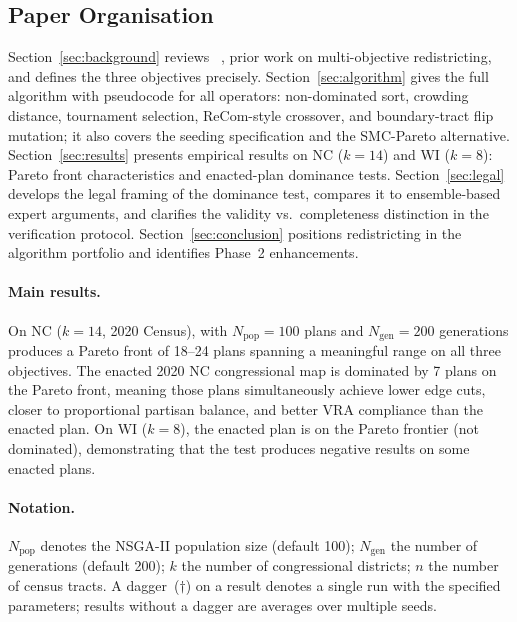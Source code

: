 \subsection{Paper Organisation}

Section~\ref{sec:background} reviews \nsga{}~\citep{deb2002}, prior work on
multi-objective redistricting, and defines the three objectives precisely.
Section~\ref{sec:algorithm} gives the full \nsga{} algorithm with pseudocode
for all operators: non-dominated sort, crowding distance, tournament selection,
ReCom-style crossover, and boundary-tract flip mutation; it also covers the
seeding specification and the SMC-Pareto alternative.
Section~\ref{sec:results} presents empirical results on NC ($k=14$) and
WI ($k=8$): Pareto front characteristics and enacted-plan dominance tests.
Section~\ref{sec:legal} develops the legal framing of the dominance test,
compares it to ensemble-based expert arguments, and clarifies the validity
vs.\ completeness distinction in the verification protocol.
Section~\ref{sec:conclusion} positions \nsga{} redistricting in the algorithm
portfolio and identifies Phase~2 enhancements.

\paragraph{Main results.}
On NC ($k=14$, 2020 Census), \nsga{} with $N_{\mathrm{pop}}=100$ plans and
$N_{\mathrm{gen}}=200$ generations produces a Pareto front of 18--24 plans
spanning a meaningful range on all three objectives.
The enacted 2020 NC congressional map is dominated by 7 plans
on the Pareto front, meaning those plans simultaneously achieve lower edge cuts,
closer to proportional partisan balance, and better VRA compliance than the
enacted plan.
On WI ($k=8$), the enacted plan is on the Pareto frontier (not dominated),
demonstrating that the test produces negative results on some enacted plans.

\paragraph{Notation.}
$N_{\mathrm{pop}}$ denotes the NSGA-II population size (default 100);
$N_{\mathrm{gen}}$ the number of generations (default 200);
$k$ the number of congressional districts;
$n$ the number of census tracts.
A dagger~($\dagger$) on a result denotes a single run with the specified
parameters; results without a dagger are averages over multiple seeds.
